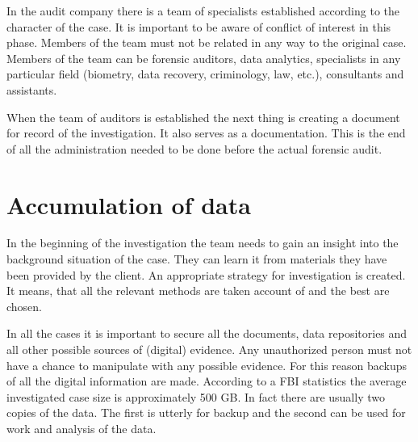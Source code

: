 In the audit company there is a team of specialists established according to the character of the case. It is important to be aware of conflict of interest in this phase. Members of the team must not be related in any way to the original case. Members of the team can be forensic auditors, data analytics, specialists in any particular field (biometry, data recovery, criminology, law, etc.), consultants and assistants. 

When the team of auditors is established the next thing is creating a document for record of the investigation. It also serves as a documentation. This is the end of all the administration needed to be done before the actual forensic audit. 

\section{Accumulation of data}
In the beginning of the investigation the team needs to gain an insight into the background situation of the case. They can learn it from materials they have been provided by the client. An appropriate strategy for investigation is created. It means, that all the relevant methods are taken account of and the best are chosen. 

In all the cases it is important to secure all the documents, data repositories and all other possible sources of (digital) evidence. Any unauthorized person must not have a chance to manipulate with any possible evidence. For this reason backups of all the digital information are made. According to a FBI statistics the average investigated case size is approximately 500 GB.  In fact there are usually two copies of the data. The first is utterly for backup and the second can be used for work and analysis of the data. 






\colorbox{green}{}

